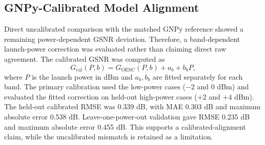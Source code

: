 \subsection{GNPy-Calibrated Model Alignment}
Direct uncalibrated comparison with the matched GNPy reference showed a remaining power-dependent GSNR deviation. Therefore, a band-dependent launch-power correction was evaluated rather than claiming direct raw agreement. The calibrated GSNR was computed as
\begin{equation}
G_{\mathrm{cal}}(P,b)=G_{\mathrm{OESC}}(P,b)+a_b+b_bP,
\end{equation}
where $P$ is the launch power in dBm and $a_b,b_b$ are fitted separately for each band. The primary calibration used the low-power cases ($-2$ and $0$ dBm) and evaluated the fitted correction on held-out high-power cases ($+2$ and $+4$ dBm). The held-out calibrated RMSE was 0.339 dB, with MAE 0.303 dB and maximum absolute error 0.538 dB. Leave-one-power-out validation gave RMSE 0.235 dB and maximum absolute error 0.455 dB. This supports a calibrated-alignment claim, while the uncalibrated mismatch is retained as a limitation.
